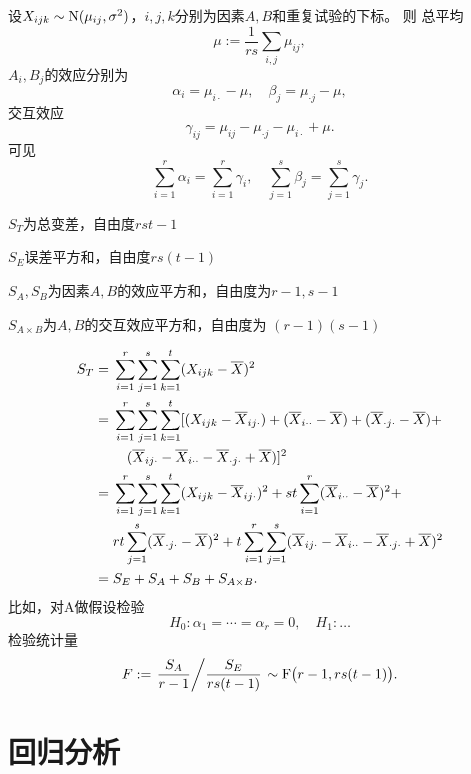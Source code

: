 设$X_{ijk}\sim\operatorname{N}(\mu_{ij},\sigma^2)$，$i, j, k $分别为因素$ A, B $和重复试验的下标。
则
总平均
\[
	\mu:=\frac1{rs}\sum_{i,j}\mu_{ij},
\]
$A_i,B_j$的效应分别为
\[
	\alpha_i=\mu_{i\cdot}-\mu,\quad\beta_j=\mu_{\cdot j}-\mu,
\]
交互效应
\[
	\gamma_{ij}=\mu_{ij}-\mu_{\cdot j}-\mu_{i\cdot}+\mu.
\]
可见
\[
	\sum_{i=1}^r\alpha_i=\sum_{i=1}^r\gamma_i,\quad\sum_{j=1}^s\beta_j=\sum_{j=1}^s\gamma_j.
\]
\begin{compactitem}
	\item $S_T$为总变差，自由度$rst-1$
	\item $S_E$误差平方和，自由度$rs(t-1)$
	\item $S_A,S_B$为因素$ A, B $的效应平方和，自由度为$ r - 1, s - 1$
	\item $S_{A\times B}$为$A,B$的交互效应平方和，自由度为 $(r - 1)(s - 1)$
\end{compactitem}
\begin{align}
	\notag
	S_T={}& \sum_{i=1}^r \sum_{j=1}^s \sum_{k=1}^t(X_{i j k}-\overline{X})^2 \\
	\notag
	={}& \sum_{i=1}^r \sum_{j=1}^s \sum_{k=1}^t[(X_{i j k}-\overline{X}_{i j \cdot})+(\overline{X}_{i\cdot\cdot}-\overline{X})+(\overline{X}_{\cdot j \cdot}-\overline{X})+\\
	\notag
	&\quad(\overline{X}_{i j \cdot}-\overline{X}_{i \cdot\cdot}-\overline{X}_{\cdot j \cdot}+\overline{X})]^2 \\
	\notag
	={}& \sum_{i=1}^r \sum_{j=1}^s \sum_{k=1}^t(X_{i j k}-\overline{X}_{i j \cdot})^2+s t \sum_{i=1}^r(\overline{X}_{i\cdot\cdot}-\overline{X})^2+ \\
	\notag
	& r t \sum_{j=1}^s(\overline{X}_{\cdot j \cdot}-\overline{X})^2+t \sum_{i=1}^r \sum_{j=1}^s(\overline{X}_{i j \cdot}-\overline{X}_{i\cdot\cdot}-\overline{X}_{\cdot j \cdot}+\overline{X})^2\\
	={}&S_E+S_A+S_B+S_{A\times B}.
\end{align}
比如，对A做假设检验
\[
	H_0:\alpha_1=\cdots=\alpha_r=0,\quad H_1:\ldots
\]
检验统计量 
\[
	F:=\left.{\frac{S_A}{r-1}}\middle/{\frac{S_E}{rs(t-1)}}\right.\sim\mathrm F\bigl(r-1,rs(t-1)\bigr).
\]

\section{回归分析}

